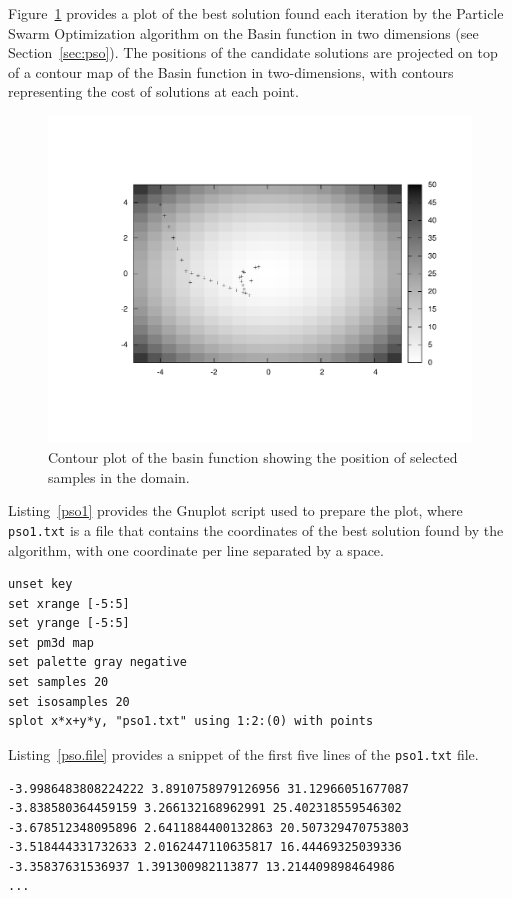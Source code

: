 Figure~\ref{plot:pso1} provides a plot of the best solution found each iteration by the Particle Swarm Optimization algorithm on the Basin function in two dimensions (see Section~\ref{sec:pso}). The positions of the candidate solutions are projected on top of a contour map of the Basin function in two-dimensions, with contours representing the cost of solutions at each point. 

\begin{figure}[htp]
\centering
\includegraphics[scale=0.5]{graphics/pso1.pdf}
\caption{Contour plot of the basin function showing the position of selected samples in the domain.}
\label{plot:pso1}
\end{figure}

Listing~\ref{pso1} provides the Gnuplot script used to prepare the plot, where \texttt{pso1.txt} is a file that contains the coordinates of the best solution found by the algorithm, with one coordinate per line separated by a space.

\begin{lstlisting}[caption=Gnuplot script use to create a contour plot and the position of selected samples from the domain., label=pso1]
unset key
set xrange [-5:5]
set yrange [-5:5]
set pm3d map
set palette gray negative
set samples 20
set isosamples 20
splot x*x+y*y, "pso1.txt" using 1:2:(0) with points
\end{lstlisting}

Listing~\ref{pso.file} provides a snippet of the first five lines of the \texttt{pso1.txt} file.

\begin{lstlisting}[caption=Snippet of the pso1.txt file., label=pso.file]
-3.9986483808224222 3.8910758979126956 31.12966051677087
-3.838580364459159 3.266132168962991 25.402318559546302
-3.678512348095896 2.6411884400132863 20.507329470753803
-3.518444331732633 2.0162447110635817 16.44469325039336
-3.35837631536937 1.391300982113877 13.214409898464986
...
\end{lstlisting}

